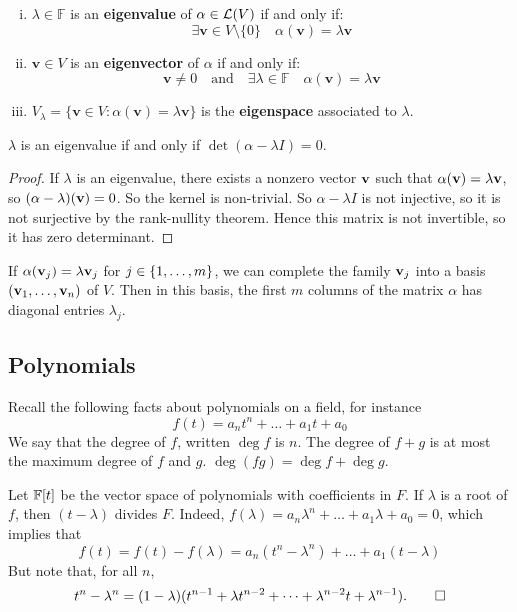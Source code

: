 \documentclass[a4paper,11pt]{article}
\begin{document}
\begin{definition}
	\begin{enumerate}[(i)]
		\item $ \lambda\in \mathbb{F} $ is an \textbf{eigenvalue} of $ \alpha\in {\mathcal{L}}(V) $ if and only if: 
		\[
			\exists \mathbf{v}\in V \setminus \{0\}\quad \alpha(\mathbf{v}) = \lambda \mathbf{v}
		\]
		\item $ \mathbf{v}\in V $ is an \textbf{eigenvector} of $\alpha$ if and only if: 
		\[
			\mathbf{v}\neq 0\quad \text{and}\quad \exists \lambda\in \mathbb{F}\quad \alpha(\mathbf{v}) = \lambda \mathbf{v}
		\]
		\item $ V_{\lambda} = \{\mathbf{v}\in V: \alpha(\mathbf{v}) = \lambda \mathbf{v}\} $ is the \textbf{eigenspace} associated to $\lambda$. 
	\end{enumerate}
\end{definition}

\begin{lemma}
	$ \lambda $ is an eigenvalue if and only if $ \det(\alpha - \lambda I) = 0 $.
\end{lemma}
\begin{proof}
	If $ \lambda $ is an eigenvalue, there exists a nonzero vector $ {\bf v} $ such that $ \alpha({\bf v}) = \lambda {\bf v} $, so $ (\alpha - \lambda)({\bf v}) = 0 $.
	So the kernel is non-trivial.
	So $ \alpha - \lambda I $ is not injective, so it is not surjective by the rank-nullity theorem.
	Hence this matrix is not invertible, so it has zero determinant.
\end{proof}

\begin{remark}
	If $ \alpha({\bf v}_j) = \lambda {\bf v}_j $ for $ j \in \qty{1, \dots, m} $, we can complete the family $ {\bf v}_j $ into a basis $ ({\bf v}_1, \dots, {\bf v}_n) $ of $ V $.
	Then in this basis, the first $ m $ columns of the matrix $ \alpha $ has diagonal entries $ \lambda_j $.
\end{remark}
\subsection{Polynomials}
Recall the following facts about polynomials on a field, for instance
\[
	f(t) = a_n t^n + \dots + a_1 t + a_0
\]
We say that the degree of $ f $, written $ \deg f $ is $ n $.
The degree of $ f + g $ is at most the maximum degree of $ f $ and $ g $.
$ \deg (fg) = \deg f + \deg g $.

Let $ {\mathbb{F}}[t] $ be the vector space of polynomials with coefficients in $ F $.
If $ \lambda $ is a root of $ f $, then $ (t-\lambda) $ divides $ F $. Indeed, $ f(\lambda) = a_n \lambda^n + \dots + a_1 \lambda + a_0 = 0 $,
which implies that
\[
	f(t) = f(t) - f(\lambda) = a_n(t^n - \lambda^n) + \dots + a_1(t - \lambda)
\]
But note that, for all $ n $,
\[
	t^n - \lambda^n = (1-\lambda)(t^{n-1} + \lambda t^{n-2} + \dots + \lambda^{n-2} t + \lambda^{n-1}).\qed
\]
\end{document}
